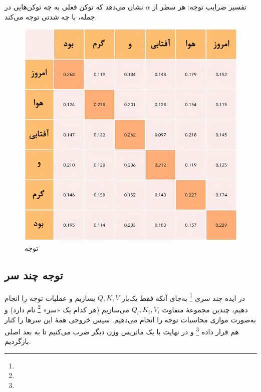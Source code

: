 تفسیر ضرایب توجه: هر سطر از \( \alpha \) نشان می‌دهد که توکن فعلی به چه توکن‌هایی در جمله، با چه شدتی توجه می‌کند.



\begin{figure}[h]
	\centering
	\begin{minipage}[b]{0.6\textwidth}
		\centering
		\includegraphics[width=\textwidth]{transformer_images/persian images/persian_images/b18.png}
		\caption{توجه}
		\label{fig:attention}
	\end{minipage}
	\hfill
	
\end{figure}



\subsection{توجه چند سر}



در ایده چند سری \footnote{}  
به‌جای آنکه فقط یک‌بار \( Q, K, V \) بسازیم و عملیات توجه را انجام دهیم، چندین مجموعهٔ متفاوت \( Q_i, K_i, V_i \) می‌سازیم (هر کدام یک «سر» \footnote{} نام دارد) و به‌صورت موازی محاسبات توجه را انجام می‌دهیم. سپس خروجی همهٔ این سرها را کنار هم قرار داده \footnote{} و در نهایت با یک ماتریس وزن دیگر ضرب می‌کنیم تا به بعد اصلی بازگردیم.

